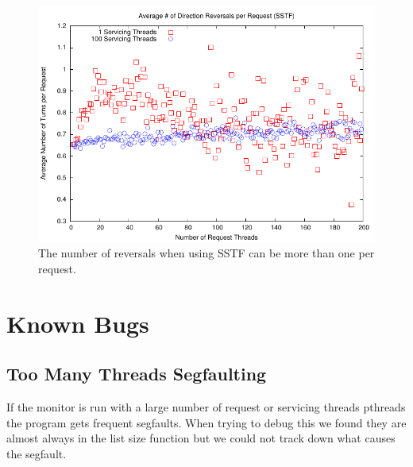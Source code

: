 \documentclass[12pt]{report}
\begin{document}
\begin{figure}[htb!]
    \centering
    \includegraphics[scale=1]{turnsSSTF.pdf}
    \caption{The number of reversals when using SSTF can be more than one per request.}
    \label{fig:turnsSSTF}
\end{figure}

\section{Known Bugs}
\subsection{Too Many Threads Segfaulting}
If the monitor is  run with a large number of request or servicing threads pthreads
the program gets frequent segfaults. When trying to debug this we found they are
almost always in the list size function but we could not track down what causes
the segfault.


\newpage
\end{document}
